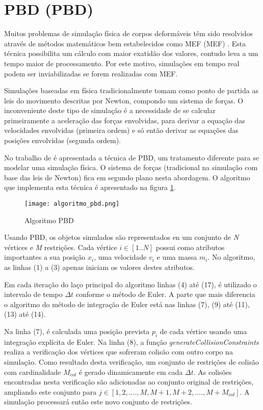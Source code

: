 \section{\acs{PBD} (\acl{PBD})}

Muitos problemas de simulação física de corpos deformáveis têm sido resolvidos através de métodos matemáticos bem estabelecidos como \acs{MEF} (\acl{MEF}) \cite{jimenez20013d}. Esta técnica possibilita um cálculo com maior exatidão dos valores, contudo leva a um tempo maior de processamento. Por este motivo, simulações em tempo real podem ser inviabilizadas se forem realizadas com \acs{MEF}.

Simulações baseadas em física tradicionalmente tomam como ponto de partida as leis do movimento descritas por Newton, compondo um sistema de forças. O inconveniente deste tipo de simulação é a necessidade de se calcular primeiramente a aceleração das forças envolvidas, para derivar a equação das velocidades envolvidas (primeira ordem) e só então derivar as equações das posições envolvidas (segunda ordem).

No trabalho de \cite{muller2007position} é apresentada a técnica de \acs{PBD}, um tratamento diferente para se modelar uma simulação física. O sistema de forças (tradicional na simulação com base das leis de Newton) fica em segundo plano nesta abordagem. O algoritmo que implementa esta técnica é apresentado na figura \ref{fig:algoritmo_PBD}.

\begin{figure}
\begin{center}
\texttt{[image: algoritmo\_pbd.png]}
\caption{Algoritmo \ac{PBD} \cite{muller2007position}}
\label{fig:algoritmo_PBD}
\end{center} 
\end{figure}

Usando \acs{PBD}, os objetos simulados são representados en um conjunto de \textit{N} vértices e \textit{M} restrições. Cada vértice $i \in [1..N]$ possui como atributos importantes a sua posição $x_i$, uma velocidade $v_i$ e uma massa $m_i$. No algoritmo, as linhas (1) a (3) apenas iniciam os valores destes atributos.

Em cada iteração do laço principal do algoritmo linhas (4) até (17), é utilizado o intervalo de tempo $\Delta t$ conforme o método de Euler. A parte que mais diferencia o algoritmo do método de integração de Euler está nas linhas (7), (9) até (11), (13) até (14).

Na linha (7), é calculada uma posição prevista $p_i$ de cada vértice usando uma integração explícita de Euler. Na linha (8), a função \textit{generateCollisionConstraints} realiza a verificação dos vértices que sofreram colisão com outro corpo na simulação. Como resultado desta verificação, um conjunto de restrições de colisão com cardinalidade $M_{col}$ é gerado dinamicamente em cada $\Delta t$. As colisões encontradas nesta verificação são adicionadas ao conjunto original de restrições, ampliando este conjunto para $j \in [1, 2, ...., M, M+1, M+2, ...., M+M_{col}]$. A simulação processará então este novo conjunto de restrições.

